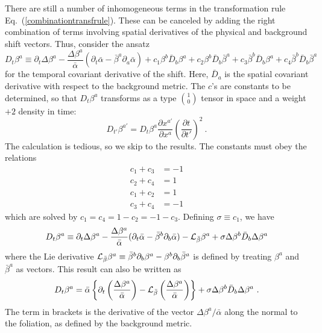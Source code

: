 \documentclass[letterpaper,nofootinbib,prd,amsmath,onecolumn]{revtex4-1}
\begin{document}
There are still a number of inhomogeneous terms in the transformation rule Eq.~(\ref{combinationtransfrule}). These 
can be canceled by adding the right combination of terms involving 
spatial derivatives of the physical and background shift vectors.  Thus, consider the ansatz 
\begin{equation}
D_{t}\beta^{a} \equiv \partial_{t}\Delta \beta^{a} - \frac{\Delta \beta^{a}}{{\bar \alpha}}(\partial_{t}{\bar \alpha} 
- {\bar \beta}^{a}\partial_{a}{\bar \alpha}) + c_{1}\beta^{b}{\bar D}_{b}\beta^{a} + c_{2}\beta^{b}{\bar D}_{b}{\bar \beta}^{a} 
+ c_{3}{\bar \beta}^{b}{\bar D}_{b}\beta^{a} + c_{4}{\bar \beta}^{b}{\bar D}_{b}{\bar \beta}^{a}
\end{equation}
for the temporal covariant derivative of the shift.  Here, $\bar D_a$ is the spatial covariant 
derivative with respect to the background metric. The $c$'s are constants to be determined, so 
that $D_t\beta^a$ transforms as a type $1 \choose 0$ tensor in space and a weight $+2$ density in time: 
\begin{equation}
D_{t'}\beta^{a'} = D_{t}\beta^{a}\frac{\partial x^{a'}}{\partial x^{a}}\left(\frac{\partial t}{\partial t'}\right)^{2} \ .
\end{equation}
The calculation is tedious, so we skip to the results. The constants must obey the relations
\begin{align*}
c_{1} + c_{3} & = -1\\
c_{2} + c_{4} & = 1\\
c_{1} + c_{2} & = 1\\
c_{3} + c_{4} & = -1 
\end{align*}
which are solved by $c_1 = c_4 = 1-c_2 = -1-c_3$. Defining $\sigma \equiv c_1$, we have 
\begin{equation}
D_{t}\beta^{a} \equiv \partial_{t}\Delta \beta^{a} - \frac{\Delta \beta^{a}}{{\bar \alpha}}(\partial_{t}{\bar \alpha} 
- {\bar \beta}^{b}\partial_{b}{\bar \alpha})  - {\cal L}_{\bar \beta} \beta^a + \sigma \Delta\beta^b \bar D_b \Delta\beta^a
\end{equation}
where the Lie derivative ${\cal L}_{\bar\beta}\beta^a \equiv \bar\beta^b \partial_b \beta^a - \beta^b \partial_b \bar\beta^a$ is defined by treating 
$\beta^a$ and $\bar\beta^a$ as vectors. This result can also be written as 
\begin{equation}
	D_t \beta^a = \bar\alpha \left\{ \partial_t \left( \frac{\Delta\beta^a}{\bar\alpha} \right) 
	- {\cal L}_{\bar\beta} \left(\frac{\Delta\beta^a}{\bar\alpha} \right)\right\} + \sigma \Delta\beta^b \bar D_b \Delta\beta^a \ .
\end{equation}
The term in brackets is the derivative of the vector $\Delta\beta^a/\bar\alpha$ along the normal to the foliation, as defined by the background metric. 
\end{document}
